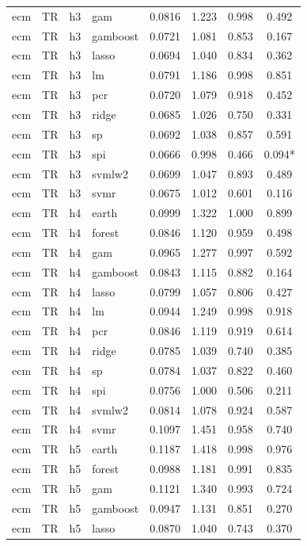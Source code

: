 \begin{ThreePartTable}
\begin{longtable}[t]{llclcccc}
ecm & TR & h3 & gam & 0.0816 & 1.223 & 0.998 & 0.492\\
ecm & TR & h3 & gamboost & 0.0721 & 1.081 & 0.853 & 0.167\\
ecm & TR & h3 & lasso & 0.0694 & 1.040 & 0.834 & 0.362\\
ecm & TR & h3 & lm & 0.0791 & 1.186 & 0.998 & 0.851\\
ecm & TR & h3 & pcr & 0.0720 & 1.079 & 0.918 & 0.452\\
ecm & TR & h3 & ridge & 0.0685 & 1.026 & 0.750 & 0.331\\
ecm & TR & h3 & sp & 0.0692 & 1.038 & 0.857 & 0.591\\
ecm & TR & h3 & spi & 0.0666 & 0.998 & 0.466 & 0.094*\\
ecm & TR & h3 & svmlw2 & 0.0699 & 1.047 & 0.893 & 0.489\\
ecm & TR & h3 & svmr & 0.0675 & 1.012 & 0.601 & 0.116\\
\addlinespace
ecm & TR & h4 & earth & 0.0999 & 1.322 & 1.000 & 0.899\\
ecm & TR & h4 & forest & 0.0846 & 1.120 & 0.959 & 0.498\\
ecm & TR & h4 & gam & 0.0965 & 1.277 & 0.997 & 0.592\\
ecm & TR & h4 & gamboost & 0.0843 & 1.115 & 0.882 & 0.164\\
ecm & TR & h4 & lasso & 0.0799 & 1.057 & 0.806 & 0.427\\
ecm & TR & h4 & lm & 0.0944 & 1.249 & 0.998 & 0.918\\
ecm & TR & h4 & pcr & 0.0846 & 1.119 & 0.919 & 0.614\\
ecm & TR & h4 & ridge & 0.0785 & 1.039 & 0.740 & 0.385\\
ecm & TR & h4 & sp & 0.0784 & 1.037 & 0.822 & 0.460\\
ecm & TR & h4 & spi & 0.0756 & 1.000 & 0.506 & 0.211\\
ecm & TR & h4 & svmlw2 & 0.0814 & 1.078 & 0.924 & 0.587\\
ecm & TR & h4 & svmr & 0.1097 & 1.451 & 0.958 & 0.740\\
\addlinespace
ecm & TR & h5 & earth & 0.1187 & 1.418 & 0.998 & 0.976\\
ecm & TR & h5 & forest & 0.0988 & 1.181 & 0.991 & 0.835\\
ecm & TR & h5 & gam & 0.1121 & 1.340 & 0.993 & 0.724\\
ecm & TR & h5 & gamboost & 0.0947 & 1.131 & 0.851 & 0.270\\
ecm & TR & h5 & lasso & 0.0870 & 1.040 & 0.743 & 0.370\\

\end{longtable}
\end{ThreePartTable}
